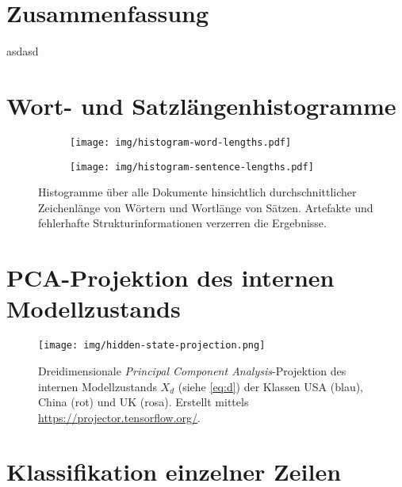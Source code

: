 \documentclass[bachelor,german]{info1thesis}
\begin{document}
\chapter{Zusammenfassung}
asdasd



\thesisbibliography


\appendix

\chapter{Wort- und Satzlängenhistogramme}
\label{app:word-sentence-lengths}

\begin{figure}[h!]
     \centering
     \begin{subfigure}[b]{0.49\textwidth}
         \centering
         \texttt{[image: img/histogram-word-lengths.pdf]}
         \label{fig:hist-mentions}
     \end{subfigure}
     \hfill
     \begin{subfigure}[b]{0.49\textwidth}
         \centering
         \texttt{[image: img/histogram-sentence-lengths.pdf]}
         \label{fig:hist-clusters}
     \end{subfigure}
     \caption{Histogramme über alle Dokumente hinsichtlich durchschnittlicher Zeichenlänge von Wörtern und Wortlänge von Sätzen. Artefakte und fehlerhafte Strukturinformationen verzerren die Ergebnisse.}
     \label{fig:droc-histograms}
\end{figure}

\chapter{PCA-Projektion des internen Modellzustands}
\label{app:hidden-state-projection}

\begin{figure}[h!]
\centering
\texttt{[image: img/hidden-state-projection.png]}
\caption{Dreidimensionale \textit{Principal Component Analysis}-Projektion des internen Modellzustands $X_d$ (siehe \autoref{eq:d}) der Klassen USA (blau), China (rot) und UK (rosa). Erstellt mittels \url{https://projector.tensorflow.org/}.}
\end{figure}

\chapter{Klassifikation einzelner Zeilen}
\label{app:hidden-state-projection}
\end{document}
